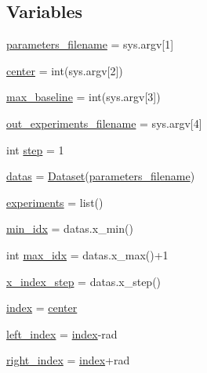 \subsection*{Variables}
\begin{DoxyCompactItemize}
\item 
\hyperlink{namespacelist__increase__baseline__experiments_a43bfd35e9474f9414c8c221dbb8b18c9}{parameters\+\_\+filename} = sys.\+argv\mbox{[}1\mbox{]}
\item 
\hyperlink{namespacelist__increase__baseline__experiments_a274e20da470f46ebffa430c90b7ff4f0}{center} = int(sys.\+argv\mbox{[}2\mbox{]})
\item 
\hyperlink{namespacelist__increase__baseline__experiments_aaff4f05a6526a72fb929368019ae7b5f}{max\+\_\+baseline} = int(sys.\+argv\mbox{[}3\mbox{]})
\item 
\hyperlink{namespacelist__increase__baseline__experiments_a5899ebc180d88f06ca89b5259654dc93}{out\+\_\+experiments\+\_\+filename} = sys.\+argv\mbox{[}4\mbox{]}
\item 
int \hyperlink{namespacelist__increase__baseline__experiments_a9ac4fa47a0cd897ac043a2c9cf9c49f9}{step} = 1
\item 
\hyperlink{namespacelist__increase__baseline__experiments_a2d9ca79006c2dc27d8ef72a04d6548ba}{datas} = \hyperlink{classpylib_1_1dataset_1_1Dataset}{Dataset}(\hyperlink{namespacelist__increase__baseline__experiments_a43bfd35e9474f9414c8c221dbb8b18c9}{parameters\+\_\+filename})
\item 
\hyperlink{namespacelist__increase__baseline__experiments_a4dabc376138c4323f09d61e391557377}{experiments} = list()
\item 
\hyperlink{namespacelist__increase__baseline__experiments_aeab9d1c4828670116525516b4c883fae}{min\+\_\+idx} = datas.\+x\+\_\+min()
\item 
int \hyperlink{namespacelist__increase__baseline__experiments_a20d2d54a7783f349843582188a006f5a}{max\+\_\+idx} = datas.\+x\+\_\+max()+1
\item 
\hyperlink{namespacelist__increase__baseline__experiments_ab2201bf911f43f516872f78b5863e3d8}{x\+\_\+index\+\_\+step} = datas.\+x\+\_\+step()
\item 
\hyperlink{namespacelist__increase__baseline__experiments_a9fb7aca9b2bd8442265f1658f525b0a6}{index} = \hyperlink{namespacelist__increase__baseline__experiments_a274e20da470f46ebffa430c90b7ff4f0}{center}
\item 
\hyperlink{namespacelist__increase__baseline__experiments_acbd3cf0e7ba4041d01c2360bd9e309be}{left\+\_\+index} = \hyperlink{namespacelist__increase__baseline__experiments_a9fb7aca9b2bd8442265f1658f525b0a6}{index}-\/rad
\item 
\hyperlink{namespacelist__increase__baseline__experiments_a64b7b40b41912296df3830ee6be178f8}{right\+\_\+index} = \hyperlink{namespacelist__increase__baseline__experiments_a9fb7aca9b2bd8442265f1658f525b0a6}{index}+rad
\end{DoxyCompactItemize}


